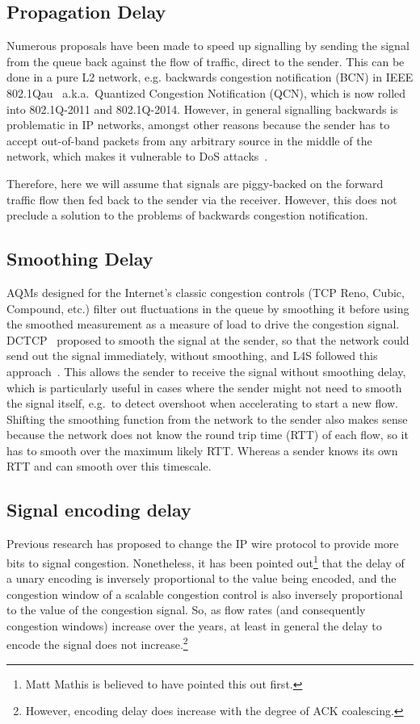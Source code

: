 \subsection{Propagation Delay} Numerous proposals have been made to speed up signalling by sending the signal from the queue back against the flow of traffic, direct to the sender. This can be done in a pure L2 network, e.g. backwards congestion notification (BCN) in IEEE 802.1Qau~\cite{IEEE802.1Qau:Ethernet_QCN} a.k.a.\ Quantized Congestion Notification (QCN), which is now rolled into 802.1Q-2011 and 802.1Q-2014. However, in general signalling backwards is problematic in IP networks, amongst other reasons because the sender has to accept out-of-band packets from any arbitrary source in the middle of the network, which makes it vulnerable to DoS attacks~\cite{IETF_RFC6633:ICMP_SQ_Depr}. 

Therefore, here we will assume that signals are piggy-backed on the forward traffic flow then fed back to the sender via the receiver. However, this does not preclude a solution to the problems of backwards congestion notification.

\subsection{Smoothing Delay} AQMs designed for the Internet's classic congestion controls (TCP Reno, Cubic, Compound, etc.) filter out fluctuations in the queue by smoothing it before using the smoothed measurement as a measure of load to drive the congestion signal. DCTCP~\cite{Alizadeh10:DCTCP} proposed to smooth the signal at the sender, so that the network could send out the signal immediately, without smoothing, and L4S followed this approach~\cite{Briscoe16a:l4s-arch_ID}. This allows the sender to receive the signal without smoothing delay, which is particularly useful in cases where the sender might not need to smooth the signal itself, e.g.\ to detect overshoot when accelerating to start a new flow. Shifting the smoothing function from the network to the sender also makes sense because the network does not know the round trip time (RTT) of each flow, so it has to smooth over the maximum likely RTT. Whereas a sender knows its own RTT and can smooth over this timescale.

\subsection{Signal encoding delay} Previous research has proposed to change the IP wire protocol to provide more bits to signal congestion. Nonetheless, it has been pointed out\footnote{Matt Mathis is believed to have pointed this out first.} that the delay of a unary encoding is inversely proportional to the value being encoded, and the congestion window of a scalable congestion control is also inversely proportional to the value of the congestion signal. So, as flow rates (and consequently congestion windows) increase over the years, at least in general the delay to encode the signal does not increase.\footnote{However, encoding delay does increase with the degree of ACK coalescing.}

